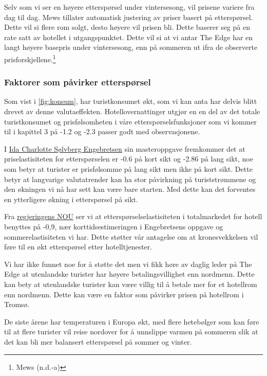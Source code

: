 \documentclass[
  12pt,
  a4paper,
  DIV=11,
  numbers=noendperiod]{scrartcl}
\begin{document}
Selv som vi ser en høyere etterspørsel under vintersesong, vil prisene
variere fra dag til dag. Mews tillater automatisk justering av priser
basert på etterspørsel. Dette vil si flere rom solgt, desto høyere vil
prisen bli. Dette baserer seg på en rate satt av hotellet i
utgangspunktet. Dette vil si at vi antar The Edge har en langt høyere
basepris under vintersesong, enn på sommeren ut ifra de observerte
prisforskjellene.\footnote{Mews (n.d.-a)}

\subsubsection{Faktorer som påvirker
etterspørsel}\label{faktorer-som-puxe5virker-etterspuxf8rsel}

Som vist i \autoref{fig:konsum}, har turistkonsumet økt, som vi kan anta
har delvis blitt drevet av denne valutaeffekten.
\hypertarget{faktorer_ettersporsel}{Hotellovernattinger
utgjør en en del av det totale turistkonsumet og prisfølsomheten i våre
etterspørselsfunksjoner som vi kommer til i kapittel 3 på -1.2 og -2.3 passer godt med observasjonene.}

I
\href{https://ntnuopen.ntnu.no/ntnu-xmlui/bitstream/handle/11250/2486498/Masteroppgave\%20Ida\%20Charlotte\%20Engebretsen.pdf}{Ida Charlotte Sølvberg Engebretsen}
sin masteroppgave fremkommer det at priselastisiteten for etterspørselen
er -0.6 på kort sikt og -2.86 på lang sikt, noe som betyr at turister er
prisfølsomme på lang sikt men ikke på kort sikt. Dette betyr at
langvarige valutatrender kan ha stor påvirkning på turiststrømmene og
den økningen vi nå har sett kan være bare starten. Med dette kan det
forventes en ytterligere økning i etterspørsel på sikt.

Fra
\href{https://www.regjeringen.no/no/dokumenter/nou-2019-11/id2645213/?ch=7}{regjeringens NOU}
ser vi at etterspørselselastisiteten i totalmarkedet for hotell benyttes
på -0,9, nær korttidsestimeringen i Engebretsens oppgave og
sommerelastisiteten vi har. Dette støtter vår antagelse om at
kronesvekkelsen vil føre til en økt etterspørsel etter hotelltjenester.

Vi har ikke funnet noe for å støtte det men vi fikk høre av daglig leder
på The Edge at utenlandske turister har høyere betalingsvillighet enn
nordmenn. Dette kan bety at utenlandske turister kan være villig til å
betale mer for et hotellrom enn nordmenn. Dette kan være en faktor som
påvirker prisen på hotellrom i Tromsø.

De siste årene har temperaturen i Europa økt, med flere hetebølger som
kan føre til at flere turister vil reise nordover for å unnslippe varmen
på sommeren slik at det kan bli mer balansert etterspørsel på sommer og
vinter.
\end{document}
